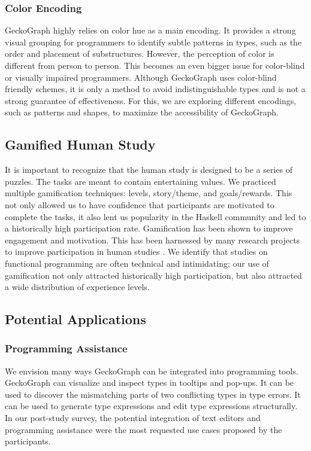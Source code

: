 \subsubsection{Color Encoding}
GeckoGraph highly relies on color hue as a main encoding. It provides a strong visual grouping  \cite{Zeng2023-jz}  for programmers to identify subtle patterns in types, such as the order and placement of substructures. However, the perception of color is different from person to person. This becomes an even bigger issue for color-blind or visually impaired programmers. Although GeckoGraph uses color-blind friendly schemes, it is only a method to avoid indistinguishable types and is not a strong guarantee of effectiveness. For this, we are exploring different encodings, such as patterns and shapes, to maximize the accessibility of GeckoGraph. 


\subsection{Gamified Human Study}

It is important to recognize that the human study is designed to be a series of puzzles. The tasks are meant to contain entertaining values. We practiced multiple gamification techniques: levels, story/theme, and goals/rewards. \cite{Hamari2014-mc} This not only allowed us to have confidence that participants are motivated to complete the tasks, it also lent us popularity in the Haskell community and led to a historically high participation rate. Gamification has been shown to improve engagement and motivation. This has been harnessed by many research projects to improve participation in human studies \cite{He2014-vp}. We identify that studies on functional programming are often technical and intimidating; our use of gamification not only attracted historically high participation, but also attracted a wide distribution of experience levels. 

\subsection{Potential Applications}
\subsubsection{Programming Assistance}
We envision many ways GeckoGraph can be integrated into programming tools. GeckoGraph can visualize and inspect types in tooltips and pop-ups. It can be used to discover the mismatching parts of two conflicting types in type errors. It can be used to generate type expressions and edit type expressions structurally. In our post-study survey, the potential integration of text editors and programming assistance were the most requested use cases proposed by the participants. 

